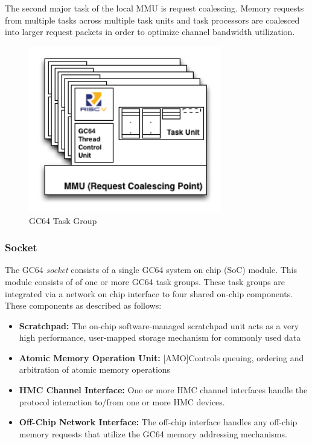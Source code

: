 \documentclass{article}
\begin{document}
The second major task of the local MMU is request coalescing.  Memory requests from 
multiple tasks across multiple task units and task processors are coalesced into larger 
request packets in order to optimize channel bandwidth utilization.  

\begin{figure}[h!]
\begin{center}
\includegraphics[width=0.75\textwidth]{gc64-task-group.png}
\caption{GC64 Task Group}
\end{center}
\label{figure:taskgroup}
\end{figure}  

\newpage
\subsubsection{Socket}

The GC64 \emph{socket} consists of a single GC64 system on chip (SoC) module.  This module 
consists of of one or more GC64 task groups.  These task groups are integrated via a network on 
chip interface to four shared on-chip components.  These components as described as follows: 

\begin{itemize}
\item \textbf{Scratchpad:} The on-chip software-managed scratchpad unit acts as a very high performance, 
user-mapped storage mechanism for commonly used data
\item \textbf{Atomic Memory Operation Unit:} [AMO]Controls queuing, ordering and arbitration of atomic memory operations
\item \textbf{HMC Channel Interface:} One or more HMC channel interfaces handle the protocol interaction to/from one or more HMC devices.  
\item \textbf{Off-Chip Network Interface:} The off-chip interface handles any off-chip memory requests that utilize the GC64 memory addressing mechanisms.  
\end{itemize}
\end{document}
